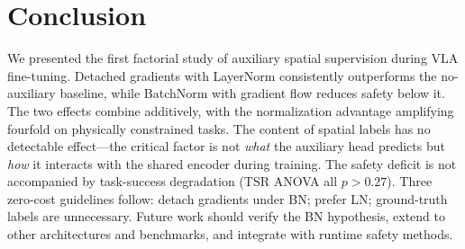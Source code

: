 
\section{Conclusion}

We presented the first factorial study of auxiliary spatial supervision during VLA fine-tuning. Detached gradients with LayerNorm consistently outperforms the no-auxiliary baseline, while BatchNorm with gradient flow reduces safety below it. The two effects combine additively, with the normalization advantage amplifying fourfold on physically constrained tasks. The content of spatial labels has no detectable effect---the critical factor is not \emph{what} the auxiliary head predicts but \emph{how} it interacts with the shared encoder during training. The safety deficit is not accompanied by task-success degradation (TSR ANOVA all $p{>}0.27$). Three zero-cost guidelines follow: detach gradients under BN; prefer LN; ground-truth labels are unnecessary. Future work should verify the BN hypothesis, extend to other architectures and benchmarks, and integrate with runtime safety methods.
